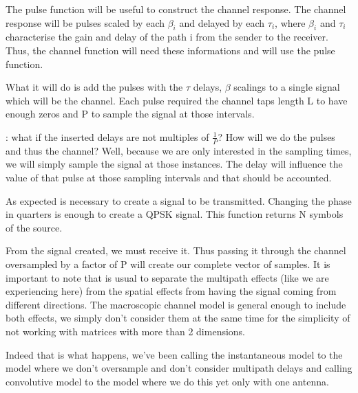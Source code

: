 \documentclass[12pt, a4paper]{article}
\begin{document}
\vspace{.5cm}
\par The pulse function will be useful to construct the channel response. The channel response will be pulses scaled by each $\beta_i$ and delayed by each $\tau_i$, where $\beta_i$ and $\tau_i$ characterise the gain and delay of the path i from the sender to the receiver. Thus, the channel function will need these informations and will use the pulse function.
\par What it will do is add the pulses with the $\tau$ delays, $\beta$ scalings to a single signal which will be the channel. Each pulse required the channel taps length L to have enough zeros and P to sample the signal at those intervals.


: what if the inserted delays are not multiples of $\frac{1}{P}$? How will we do the pulses and thus the channel?
Well, because we are only interested in the sampling times, we will simply sample the signal at those instances. The delay will influence the value of that pulse at those sampling intervals and that should be accounted.

\vspace{.5cm}

\par As expected is necessary to create a signal to be transmitted. Changing the phase in quarters is enough to create a QPSK signal. This function returns N symbols of the source.


\vspace{.5cm}




\par From the signal created, we must receive it. Thus passing it through the channel oversampled by a factor of P will create our complete vector of samples. It is important to note that is usual to separate the multipath effects (like we are experiencing here) from the spatial effects from having the signal coming from different directions. The macroscopic channel model is general enough to include both effects, we simply don't consider them at the same time for the simplicity of not working with matrices with more than 2 dimensions.

Indeed that is what happens, we've been calling the instantaneous model to the model where we don't oversample and don't consider multipath delays and calling convolutive model to the model where we do this yet only with one antenna.
\end{document}
